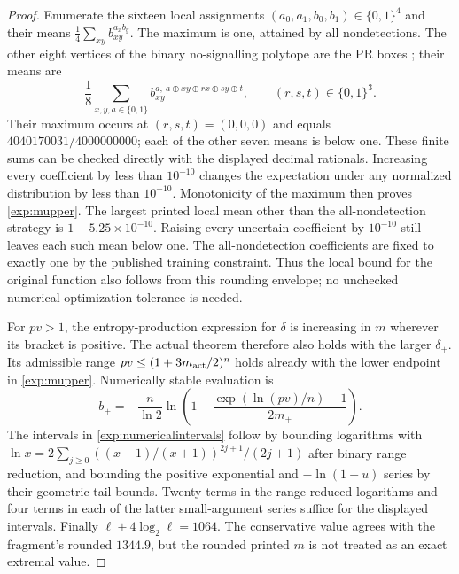 \documentclass[11pt,a4paper]{article}
\theoremstyle{definition}
\theoremstyle{remark}\newtheorem{remark}[theorem]{Remark}
\begin{document}
\begin{proof}
Enumerate the sixteen local assignments $(a_0,a_1,b_0,b_1)\in\{0,1\}^4$ and their means $\frac14\sum_{xy}b_{xy}^{a_xb_y}$. The maximum is one, attained by all nondetections. The other eight vertices of the binary no-signalling polytope are the PR boxes \cite[App.~A.3]{Pironio10}; their means are
\[
 \frac18\sum_{x,y,a\in\{0,1\}}
 b_{xy}^{a,\ a\oplus xy\oplus rx\oplus sy\oplus t},
 \qquad (r,s,t)\in\{0,1\}^3.
\]
Their maximum occurs at $(r,s,t)=(0,0,0)$ and equals
$4040170031/4000000000$; each of the other seven means is below one. These finite sums can be checked directly with the displayed decimal rationals. Increasing every coefficient by less than $10^{-10}$ changes the expectation under any normalized distribution by less than $10^{-10}$. Monotonicity of the maximum then proves \eqref{exp:mupper}. The largest printed local mean other than the all-nondetection strategy is $1-5.25\times10^{-10}$. Raising every uncertain coefficient by $10^{-10}$ still leaves each such mean below one. The all-nondetection coefficients are fixed to exactly one by the published training constraint. Thus the local bound for the original function also follows from this rounding envelope; no unchecked numerical optimization tolerance is needed.

For $pv>1$, the entropy-production expression for $\delta$ is increasing in $m$ wherever its bracket is positive. The actual theorem therefore also holds with the larger $\delta_+$. Its admissible range $pv\le(1+3m_{\rm act}/2)^n$ holds already with the lower endpoint in \eqref{exp:mupper}. Numerically stable evaluation is
\[
 b_+=-\frac{n}{\ln2}\ln\!\left(1-
 \frac{\exp(\ln(pv)/n)-1}{2m_+}\right).
\]
The intervals in \eqref{exp:numericalintervals} follow by bounding logarithms with
$\ln x=2\sum_{j\ge0}((x-1)/(x+1))^{2j+1}/(2j+1)$ after binary range reduction, and bounding the positive exponential and $-\ln(1-u)$ series by their geometric tail bounds. Twenty terms in the range-reduced logarithms and four terms in each of the latter small-argument series suffice for the displayed intervals. Finally $\ell+4\log_2\ell=1064$. The conservative value agrees with the fragment's rounded $1344.9$, but the rounded printed $m$ is not treated as an exact extremal value.
\end{proof}
\end{document}
